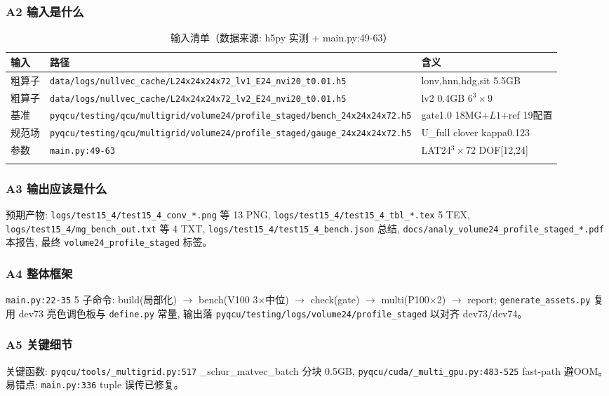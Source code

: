 \documentclass[UTF8]{ctexart}
\begin{document}
\subsubsection{A2 输入是什么}
\begin{xltabular}{\textwidth}{lXl}
\toprule
输入 & 路径 & 含义 \\
\midrule
\endhead
粗算子 & \texttt{\nolinkurl{data/logs/nullvec_cache/L24x24x24x72_lv1_E24_nvi20_t0.01.h5}} & lonv,hnn,hdg,sit 5.5GB \\
粗算子 & \texttt{\nolinkurl{data/logs/nullvec_cache/L24x24x24x72_lv2_E24_nvi20_t0.01.h5}} & lv2 0.4GB 6$^3\times$9 \\
基准 & \texttt{\nolinkurl{pyqcu/testing/qcu/multigrid/volume24/profile_staged/bench_24x24x24x72.h5}} & gate1.0 18MG+$L1$+ref 19配置 \\
规范场 & \texttt{\nolinkurl{pyqcu/testing/qcu/multigrid/volume24/profile_staged/gauge_24x24x24x72.h5}} & U\_full clover kappa0.123 \\
参数 & \texttt{\nolinkurl{main.py:49-63}} & LAT24$^3\times$72 DOF[12,24] \\
\bottomrule
\caption{输入清单（数据来源: h5py 实测 + main.py:49-63）}
\end{xltabular}

\subsubsection{A3 输出应该是什么}
预期产物: \texttt{\nolinkurl{logs/test15_4/test15_4_conv_*.png}} 等 13 PNG, \texttt{\nolinkurl{logs/test15_4/test15_4_tbl_*.tex}} 5 TEX, \texttt{\nolinkurl{logs/test15_4/mg_bench_out.txt}} 等 4 TXT, \texttt{\nolinkurl{logs/test15_4/test15_4_bench.json}} 总结, \texttt{\nolinkurl{docs/analy_volume24_profile_staged_*.pdf}} 本报告, 最终 \texttt{\nolinkurl{volume24_profile_staged}} 标签。

\subsubsection{A4 整体框架}
\texttt{\nolinkurl{main.py:22-35}} 5 子命令: build(局部化) $\to$ bench(V100 3$\times$中位) $\to$ check(gate) $\to$ multi(P100$\times$2) $\to$ report; \texttt{\nolinkurl{generate_assets.py}} 复用 dev73 亮色调色板与 \texttt{\nolinkurl{define.py}} 常量, 输出落 \texttt{\nolinkurl{pyqcu/testing/logs/volume24/profile_staged}} 以对齐 dev73/dev74。

\subsubsection{A5 关键细节}
关键函数: \texttt{\nolinkurl{pyqcu/tools/_multigrid.py:517}} \_schur\_matvec\_batch 分块 0.5GB, \texttt{\nolinkurl{pyqcu/cuda/_multi_gpu.py:483-525}} fast-path 避OOM。易错点: \texttt{\nolinkurl{main.py:336}} tuple 误传已修复。

\end{document}
